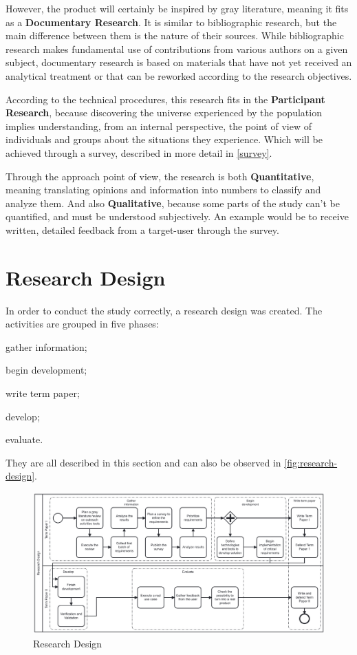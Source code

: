 However, the product will certainly be inspired by gray literature, meaning it fits as a \textbf{Documentary Research}. It is similar to bibliographic research, but the main difference between them is the nature of their sources. While bibliographic research makes fundamental use of contributions from various authors on a given subject, documentary research is based on materials that have not yet received an analytical treatment or that can be reworked according to the research objectives.

According to the technical procedures, this research fits in the \textbf{Participant Research}, because discovering the universe experienced by the population implies understanding, from an internal perspective, the point of view of individuals and groups about the situations they experience. Which will be achieved through a survey, described in more detail in \autoref{survey}.

Through the approach point of view, the research is both \textbf{Quantitative}, meaning translating opinions and information into numbers to classify and analyze them. And also \textbf{Qualitative}, because some parts of the study can't be quantified, and must be understood subjectively. An example would be to receive written, detailed feedback from a target-user through the survey.

\section{Research Design}\label{sec:met-3}

In order to conduct the study correctly, a research design was created. The activities are grouped in five phases:
\begin{inparaenum}[(1)]
    \item gather information;
    \item begin development;
    \item write term paper;
    \item develop;
    \item evaluate.
\end{inparaenum}
They are all described in this section and can also be observed in \autoref{fig:research-design}.

\begin{figure}[htb]
    \caption{Research Design}\label{fig:research-design}
    \begin{center}
        \includegraphics[width=16cm]{img/research design.pdf}
    \end{center}
\end{figure}

